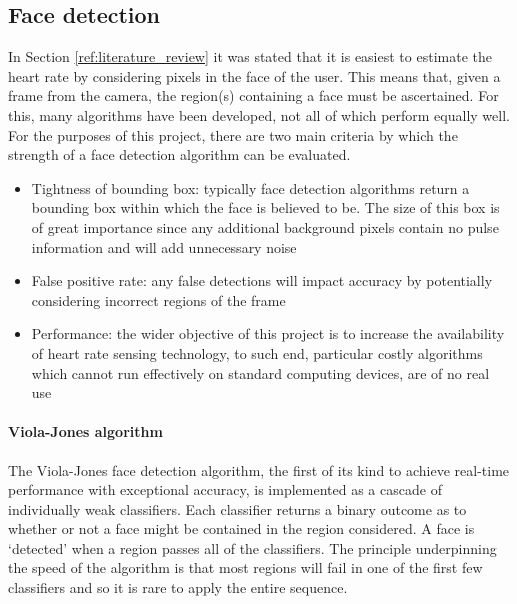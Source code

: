 \subsection{Face detection}
In Section \ref{ref:literature_review} it was stated that it is 
easiest to estimate the heart rate by considering pixels in the face of the user. 
This means that, given a frame from the camera, the region(s) containing a face must be ascertained. For this, many algorithms have been developed, not all of which perform equally well.
For the purposes of this project, there are two main criteria by which the strength of a face detection algorithm can be evaluated.
\begin{itemize}
    \item Tightness of bounding box: typically face detection algorithms return a bounding box within which the face is believed to be. The size of this box is of great importance since any additional background pixels contain no pulse information and will add unnecessary noise
    \item False positive rate: any false detections will impact accuracy by potentially considering incorrect regions of the frame
    \item Performance: the wider objective of this project is to increase the availability of heart rate sensing technology, to such end, particular costly algorithms which cannot run effectively on standard computing devices, are of no real use
\end{itemize}


\paragraph{Viola-Jones algorithm} 
The Viola-Jones face detection algorithm\cite{Viola2004}, the first of its kind to achieve real-time performance with exceptional accuracy, is implemented as a cascade of 
individually weak classifiers. Each classifier returns a binary outcome as to whether or not a face might be contained in the region considered.
A face is `detected' when a region passes all of the classifiers. The principle underpinning the speed of the algorithm is that most regions will fail in one of the first few classifiers
and so it is rare to apply the entire sequence.

